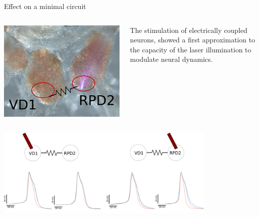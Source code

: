 \documentclass[aspectratio=43]{beamer}
\begin{document}
\begin{frame}{Effect on a minimal circuit}
	
	\begin{columns}
		\begin{column}{0.3\textwidth}
			\includegraphics[width=\textwidth]{Images/electrical_ganglia.png}
		\end{column}
	\vspace{15pt}
		\begin{column}{0.7\textwidth}
			The stimulation of electrically coupled neurons, showed a first approximation to the capacity of the laser illumination to modulate neural dynamics. 
		\end{column}
	\end{columns}
	\includegraphics[width=0.8\textwidth]{Images/electrical_result.png}	
\end{frame}

%			
\end{document}
